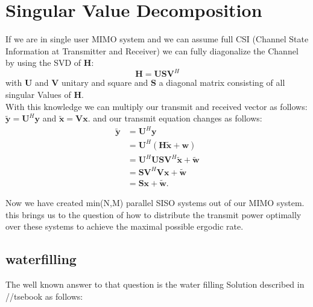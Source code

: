 \section{Singular Value Decomposition}
If we are in single user MIMO system and we can assume full CSI (Channel State Information at Transmitter and Receiver) we can fully diagonalize the Channel by using the SVD of $\mathbf{H}$:
\begin{equation}
	\mathbf{H} = \mathbf{USV}^H
\end{equation}
with $\mathbf{U}$ and $\mathbf{V}$ unitary and square and $\mathbf{S}$ a diagonal matrix consisting of all singular Values of $\mathbf{H}$.\\
With this knowledge we can multiply our transmit and received vector as follows: $\mathbf{\tilde{y}} = \mathbf{U}^H\mathbf{y} $ and $ \mathbf{\tilde{x}} = \mathbf{Vx}$. and our transmit equation changes as follows: 
\begin{align}
	\mathbf{\tilde{y}} &= \mathbf{U}^H\mathbf{y} \\
	& = \mathbf{U}^H(\mathbf{H\tilde{x} + w}) \\
	& = \mathbf{U}^H\mathbf{USV}^H\mathbf{\tilde{x}+\tilde{w}}\\
	& = \mathbf{SV}^H\mathbf{Vx}+\mathbf{\tilde{w}}\\
	&= \mathbf{Sx + \tilde{w}}.
\end{align}

Now we have created min(N,M) parallel SISO systems out of our MIMO system. this brings us to the question of how to distribute the transmit power optimally over these systems to achieve the maximal possible ergodic rate.
\subsection{waterfilling}
The well known answer to that question is the water filling Solution described in //tsebook as follows:
